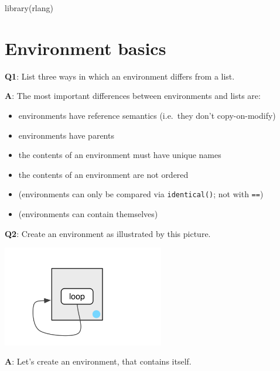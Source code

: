 \documentclass[
]{krantz}
\makeatletter
\newenvironment{Shaded}{\begin{snugshade}}{\end{snugshade}}
\newcommand{\KeywordTok}[1]{\textcolor[rgb]{0.13,0.29,0.53}{\textbf{#1}}}
\newcommand{\NormalTok}[1]{#1}
\providecommand{\tightlist}{%
  \setlength{\itemsep}{0pt}\setlength{\parskip}{0pt}}
\newenvironment{kframe}{%
\medskip{}
\setlength{\fboxsep}{.8em}
 \def\at@end@of@kframe{}%
 \ifinner\ifhmode%
  \def\at@end@of@kframe{\end{minipage}}%
  \begin{minipage}{\columnwidth}%
 \fi\fi%
 \def\FrameCommand##1{\hskip\@totalleftmargin \hskip-\fboxsep
 \colorbox{shadecolor}{##1}\hskip-\fboxsep
     \hskip-\linewidth \hskip-\@totalleftmargin \hskip\columnwidth}%
 \MakeFramed {\advance\hsize-\width
   \@totalleftmargin\z@ \linewidth\hsize
   \@setminipage}}%
 {\par\unskip\endMakeFramed%
 \at@end@of@kframe}
\renewenvironment{Shaded}{\begin{kframe}}{\end{kframe}}
\renewcommand{\KeywordTok} [1]{\textcolor[rgb]{0.00,0.44,0.13}{{#1}}}
\renewcommand{\NormalTok}  [1]{{#1}}
\makeatother
\begin{document}
\begin{Shaded}
\begin{Highlighting}[]
\KeywordTok{library}\NormalTok{(rlang)}
\end{Highlighting}
\end{Shaded}


\hypertarget{environment-basics}{%
\section{Environment basics}\label{environment-basics}}

\textbf{{Q1}}: List three ways in which an environment differs from a list.

\textbf{{A}}: The most important differences between environments and lists are:

\begin{itemize}
\tightlist
\item
  environments have reference semantics (i.e.~they don't copy-on-modify)
\item
  environments have parents
\item
  the contents of an environment must have unique names
\item
  the contents of an environment are not ordered
\item
  (environments can only be compared via \texttt{identical()}; not with \texttt{==})
\item
  (environments can contain themselves)
\end{itemize}

\textbf{{Q2}}: Create an environment as illustrated by this picture.

\begin{center}\includegraphics[width=200pt]{images/environments/recursive-1} \end{center}

\textbf{{A}}: Let's create an environment, that contains itself.
\end{document}
